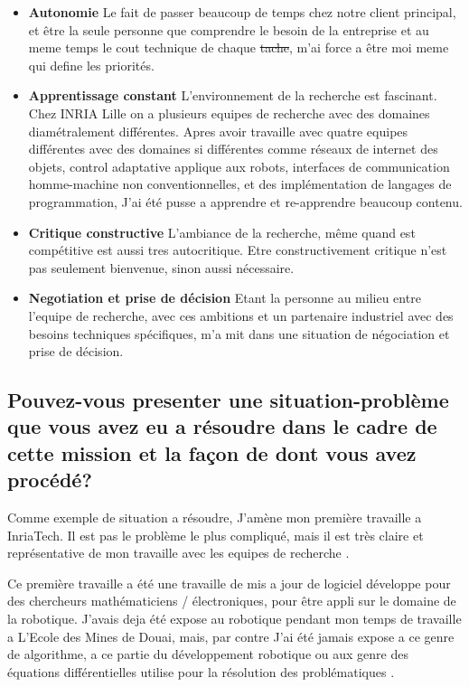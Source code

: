 \documentclass{resume} %
\providecommand{\DIFaddtex}[1]{{\protect\color{blue}\uwave{#1}}} %
\providecommand{\DIFdeltex}[1]{{\protect\color{red}\sout{#1}}}                      %
\providecommand{\DIFaddbegin}{} %
\providecommand{\DIFaddend}{} %
\providecommand{\DIFdelbegin}{} %
\providecommand{\DIFdelend}{} %
\providecommand{\DIFadd}[1]{\texorpdfstring{\DIFaddtex{#1}}{#1}} %
\providecommand{\DIFdel}[1]{\texorpdfstring{\DIFdeltex{#1}}{}} %
\begin{document}
			 \begin{itemize}  				
			\item \textbf{Autonomie} \newline
				Le fait de passer beaucoup de temps chez notre client principal, et être la seule personne que comprendre le besoin de la entreprise et au meme temps le cout technique de chaque \DIFdelbegin \DIFdel{tache}\DIFdelend \DIFaddbegin \DIFadd{tâche}\DIFaddend , m'ai force a être moi meme qui define les priorités. 
			\item \textbf{Apprentissage constant } \newline
				L'environnement de la recherche est fascinant. Chez INRIA Lille on a plusieurs equipes de recherche avec des domaines diamétralement différentes. Apres avoir travaille avec quatre equipes différentes avec des domaines si différentes comme réseaux de internet des objets, control adaptative applique aux robots,  interfaces de communication homme-machine non conventionnelles, et des implémentation de langages de programmation, J'ai été pusse a apprendre et re-apprendre beaucoup contenu. 
			\item \textbf{Critique constructive} \newline
				L'ambiance de la recherche, même quand est compétitive est aussi tres autocritique. Etre constructivement critique n'est pas seulement bienvenue, sinon aussi nécessaire.
			\item \textbf{Negotiation et prise de décision } \newline
				Etant la personne au milieu entre l'equipe de recherche, avec ces ambitions et un partenaire industriel avec des besoins techniques spécifiques, m'a mit dans une situation de négociation  et prise de décision. 
		 \end{itemize} 

		
	\subsection{Pouvez-vous presenter une situation-problème que vous avez eu a résoudre dans le cadre de cette mission et la façon de dont vous avez procédé?}

		Comme exemple de situation a résoudre, J'amène mon première travaille a InriaTech. Il est pas le problème le plus compliqué, mais il est très claire et représentative de mon travaille avec les equipes de recherche .  

		 Ce première travaille a été une travaille de mis a jour de logiciel développe pour des chercheurs mathématiciens / électroniques, pour être appli sur le domaine de la robotique. 
		J'avais deja été expose au robotique pendant mon temps de travaille a L'Ecole des Mines de Douai, mais, par contre J'ai été jamais expose a ce genre de algorithme, a ce partie du développement robotique ou aux genre des équations différentielles utilise pour la résolution des problématiques . 
\end{document}
